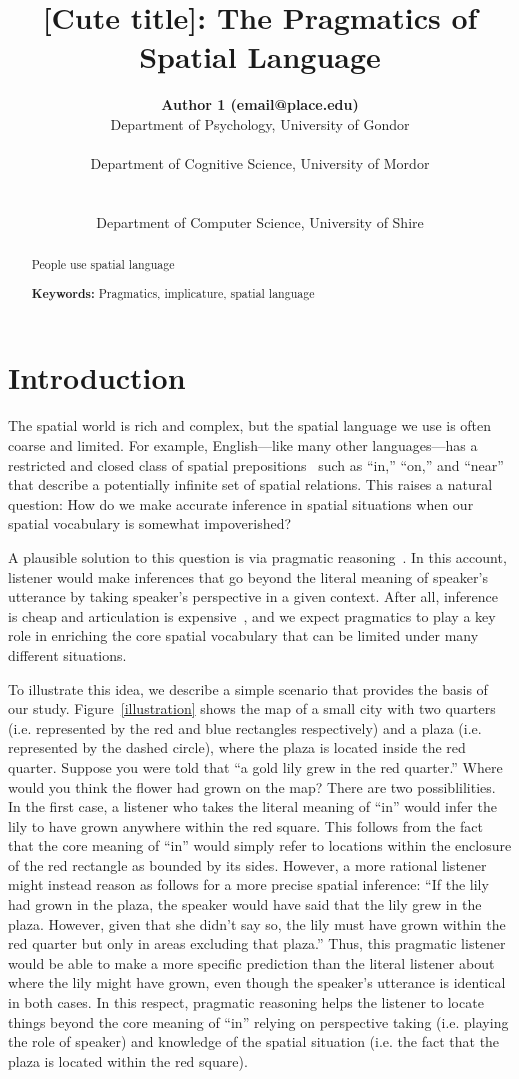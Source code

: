 \documentclass[10pt,letterpaper]{article}
\title{[Cute title]: The Pragmatics of Spatial Language}
\author{
{\large \bf Author 1 (email@place.edu)} \\
  Department of Psychology, University of Gondor\\
  \And{\large \bf Author 2 (email@place.edu)} \\
  Department of Cognitive Science, University of Mordor \\
  \\
 \AND{\large \bf Author 3 (email@people.edu)} \\
  Department of Computer Science, University of Shire\\
}
\begin{document}
\maketitle

\begin{abstract}
People use spatial language

\textbf{Keywords:} 
Pragmatics, implicature, spatial language
\end{abstract}

\section{Introduction}

The spatial world is rich and complex, but the spatial language we use is often coarse and limited. For example, English---like many other languages---has a restricted and closed class of spatial prepositions~\cite{talmy83,talmy00,landau93} such as ``in,'' ``on,'' and ``near'' that describe a potentially infinite set of spatial relations. This raises a natural question: How do we make accurate inference in spatial situations when our spatial vocabulary is somewhat impoverished?

A plausible solution to this question is via pragmatic reasoning~\cite{}. In this account, listener would make inferences that go beyond the literal meaning of speaker's utterance by taking speaker's perspective in a given context. After all, inference is cheap and articulation is expensive~\cite{levinson00}, and we expect pragmatics to play a key role in enriching the core spatial vocabulary that can be limited under many different situations. 

To illustrate this idea, we describe a simple scenario that provides the basis of our study. Figure~\ref{illustration} shows the map of a small city with two quarters (i.e. represented by the red and blue rectangles respectively) and a plaza (i.e. represented by the dashed circle), where the plaza is located inside the red quarter. Suppose you were told that ``a gold lily grew in the red quarter.'' Where would you think the flower had grown on the map? There are two possiblilities. In the first case, a listener who takes the literal meaning of ``in'' would infer the lily to have grown anywhere within the red square. This follows from the fact that the core meaning of ``in'' would simply refer to locations within the enclosure of the red rectangle as bounded by its sides. However, a more rational listener might instead reason as follows for a more precise spatial inference: ``If the lily had grown in the plaza, the speaker would have said that the lily grew in the plaza. However, given that she didn't say so, the lily must have grown within the red quarter but only in areas excluding that plaza.'' Thus, this pragmatic listener would be able to make a more specific prediction than the literal listener about where the lily might have grown, even though the speaker's utterance is identical in both cases. In this respect, pragmatic reasoning helps the listener to locate things beyond the core meaning of ``in'' relying on perspective taking (i.e. playing the role of speaker) and knowledge of the spatial situation (i.e. the fact that the plaza is located within the red square).
\end{document}
